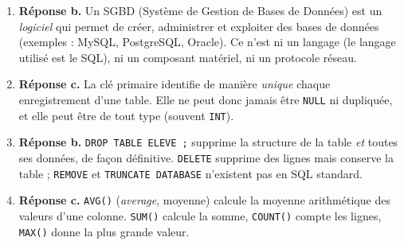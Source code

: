 \documentclass[11pt]{article}
\newcommand{\cle}[1]{{\popxbold\color{popdark}#1}}
\begin{document}
\begin{corrige}
\begin{enumerate}
\item \textbf{Réponse b.} Un \cle{SGBD} (Système de Gestion de Bases de Données) est un \emph{logiciel} qui permet de créer, administrer et exploiter des bases de données (exemples : MySQL, PostgreSQL, Oracle). Ce n'est ni un langage (le langage utilisé est le SQL), ni un composant matériel, ni un protocole réseau.
\item \textbf{Réponse c.} La \cle{clé primaire} identifie de manière \emph{unique} chaque enregistrement d'une table. Elle ne peut donc jamais être \texttt{NULL} ni dupliquée, et elle peut être de tout type (souvent \texttt{INT}).
\item \textbf{Réponse b.} \texttt{DROP TABLE ELEVE ;} supprime la structure de la table \emph{et} toutes ses données, de façon définitive. \texttt{DELETE} supprime des lignes mais conserve la table ; \texttt{REMOVE} et \texttt{TRUNCATE DATABASE} n'existent pas en SQL standard.
\item \textbf{Réponse c.} \texttt{AVG()} (\emph{average}, moyenne) calcule la moyenne arithmétique des valeurs d'une colonne. \texttt{SUM()} calcule la somme, \texttt{COUNT()} compte les lignes, \texttt{MAX()} donne la plus grande valeur.
\end{enumerate}
\end{corrige}
\end{document}
